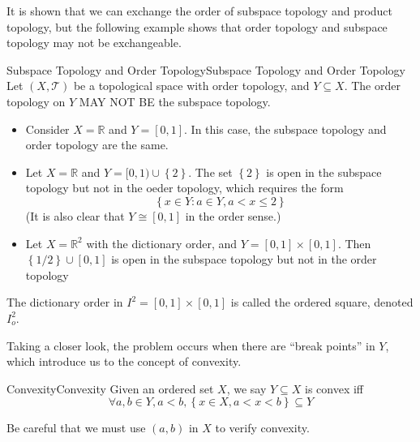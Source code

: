 \documentclass[../main.tex]{subfiles}
\begin{document}
It is shown that we can exchange the order of subspace topology and product topology, but the following example shows that order topology and subspace topology may not be exchangeable.

\begin{example}{Subspace Topology and Order Topology}{Subspace Topology and Order Topology}
Let $(X,\mathcal{T})$ be a topological space with order topology, and $Y \subseteq X$. The order topology on $Y$ MAY NOT BE the subspace topology.

\begin{itemize}
\item Consider $X = \mathbb{R}$ and $Y = [0,1]$. In this case, the subspace topology and order topology are the same.
\item Let $X = \mathbb{R}$ and $Y = [0,1)\cup \left\{ 2 \right\}$. The set $\left\{ 2 \right\}$ is open in the subspace topology but not in the oeder topology, which requires the form
	\begin{equation*}
	\left\{ x\in Y: a\in Y, a<x\leq 2 \right\}
	\end{equation*}
	(It is also clear that $Y \cong [0,1]$ in the order sense.)
\item Let $X = \mathbb{R}^2$ with the dictionary order, and $Y = [0,1] \times [0,1]$. Then $\left\{ 1 / 2 \right\}\cup [0,1]$ is open in the subspace topology but not in the order topology
\end{itemize}
\end{example}

The dictionary order in $I^2 = [0,1] \times [0,1]$ is called the ordered square, denoted $I^2_o$.

\begin{remark}
Taking a closer look, the problem occurs when there are ``break points'' in $Y$, which introduce us to the concept of convexity.
\end{remark}

\begin{definition}{Convexity}{Convexity}
Given an ordered set $X$, we say $Y \subseteq X$ is convex iff
\begin{equation*}
\forall a,b\in Y,a<b, \left\{ x\in X,a<x<b \right\} \subseteq Y
\end{equation*}
\end{definition}
Be careful that we must use $(a,b)$ in $X$ to verify convexity.
\end{document}
